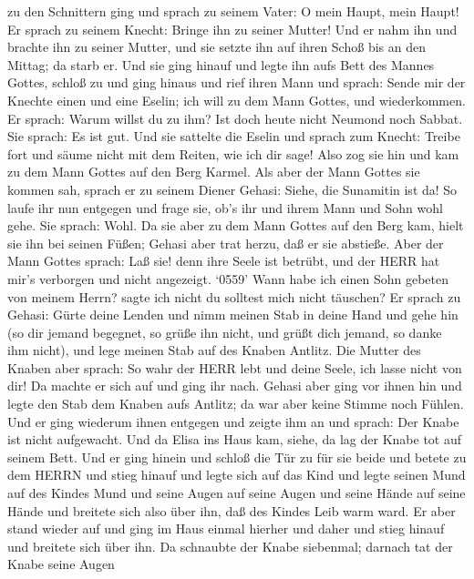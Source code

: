 zu den Schnittern ging  und sprach zu seinem Vater: O mein
Haupt, mein Haupt! Er sprach zu seinem Knecht: Bringe ihn zu seiner
Mutter!  Und er nahm ihn und brachte ihn zu seiner Mutter,
und sie setzte ihn auf ihren Schoß bis an den Mittag; da starb er.
 Und sie ging hinauf und legte ihn aufs Bett des Mannes
Gottes, schloß zu und ging hinaus  und rief ihren Mann und
sprach: Sende mir der Knechte einen und eine Eselin; ich will zu dem
Mann Gottes, und wiederkommen.  Er sprach: Warum willst du
zu ihm? Ist doch heute nicht Neumond noch Sabbat. Sie sprach: Es ist
gut.  Und sie sattelte die Eselin und sprach zum Knecht:
Treibe fort und säume nicht mit dem Reiten, wie ich dir sage!
 Also zog sie hin und kam zu dem Mann Gottes auf den Berg
Karmel. Als aber der Mann Gottes sie kommen sah, sprach er zu seinem
Diener Gehasi: Siehe, die Sunamitin ist da!  So laufe ihr
nun entgegen und frage sie, ob's ihr und ihrem Mann und Sohn wohl gehe.
Sie sprach: Wohl.  Da sie aber zu dem Mann Gottes auf den
Berg kam, hielt sie ihn bei seinen Füßen; Gehasi aber trat herzu, daß er
sie abstieße. Aber der Mann Gottes sprach: Laß sie! denn ihre Seele ist
betrübt, und der HERR hat mir's verborgen und nicht angezeigt.
 `0559' Wann habe ich einen Sohn gebeten von meinem Herrn?
sagte ich nicht du solltest mich nicht täuschen?  Er sprach
zu Gehasi: Gürte deine Lenden und nimm meinen Stab in deine Hand und
gehe hin (so dir jemand begegnet, so grüße ihn nicht, und grüßt dich
jemand, so danke ihm nicht), und lege meinen Stab auf des Knaben
Antlitz.  Die Mutter des Knaben aber sprach: So wahr der
HERR lebt und deine Seele, ich lasse nicht von dir! Da machte er sich
auf und ging ihr nach.  Gehasi aber ging vor ihnen hin und
legte den Stab dem Knaben aufs Antlitz; da war aber keine Stimme noch
Fühlen. Und er ging wiederum ihnen entgegen und zeigte ihm an und
sprach: Der Knabe ist nicht aufgewacht.  Und da Elisa ins
Haus kam, siehe, da lag der Knabe tot auf seinem Bett.  Und
er ging hinein und schloß die Tür zu für sie beide und betete zu dem
HERRN  und stieg hinauf und legte sich auf das Kind und
legte seinen Mund auf des Kindes Mund und seine Augen auf seine Augen
und seine Hände auf seine Hände und breitete sich also über ihn, daß des
Kindes Leib warm ward.  Er aber stand wieder auf und ging
im Haus einmal hierher und daher und stieg hinauf und breitete sich über
ihn. Da schnaubte der Knabe siebenmal; darnach tat der Knabe seine Augen
